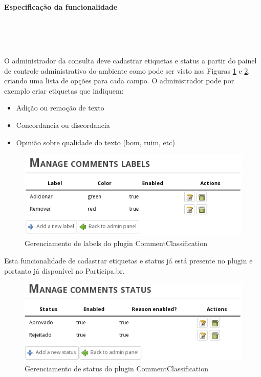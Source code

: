 \documentclass[12pt]{article}
\begin{document}
\paragraph{Especificação da funcionalidade} \

\

O administrador da consulta deve cadastrar etiquetas e status a partir do
painel de controle administrativo do ambiente como pode ser visto nas Figuras
\ref{manage-labels} e \ref{manage-status}, criando uma lista de opções para
cada campo. O administrador pode por exemplo criar etiquetas que indiquem:

\begin{itemize}
  \item Adição ou remoção de texto
  \item Concordancia ou discordancia
  \item Opinião sobre qualidade do texto (bom, ruim, etc)
\end{itemize}

\begin{figure}[h!]
\center
\includegraphics[scale=0.5]{manage-labels.png}
\caption{Gerenciamento de labels do plugin CommentClassification}
\label{manage-labels}
\end{figure}

Esta funcionalidade de cadastrar etiquetas e status já está presente no plugin
e portanto já disponível no Participa.br.

\begin{figure}[h!]
\center
\includegraphics[scale=0.5]{manage-status.png}
\caption{Gerenciamento de status do plugin CommentClassification}
\label{manage-status}
\end{figure}
\end{document}
